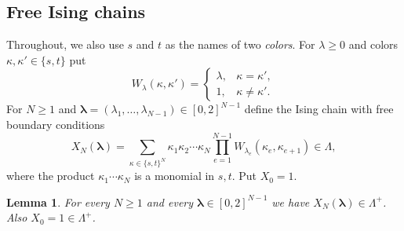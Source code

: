 \documentclass{amsart}
\newtheorem{lemma}[theorem]{Lemma}
\theoremstyle{definition}
\theoremstyle{remark}
\numberwithin{equation}{section}
\newcommand{\Lp}{\Lambda^{+}}
\begin{document}
\subsection{Free Ising chains}
Throughout, we also use $s$ and $t$ as the names of two \emph{colors}. For $\lambda\ge0$ and colors $\kappa,\kappa'\in\{s,t\}$ put
\[
W_\lambda(\kappa,\kappa')=\begin{cases}\lambda,&\kappa=\kappa',\\ 1,&\kappa\ne\kappa'.\end{cases}
\]
For $N\ge1$ and $\boldsymbol\lambda=(\lambda_1,\dots,\lambda_{N-1})\in[0,2]^{N-1}$ define the Ising chain with free boundary conditions
\[
X_N(\boldsymbol\lambda)=\sum_{\kappa\in\{s,t\}^N}\kappa_1\kappa_2\cdots\kappa_N\prod_{e=1}^{N-1}W_{\lambda_e}(\kappa_e,\kappa_{e+1})\in\Lambda,
\]
where the product $\kappa_1\cdots\kappa_N$ is a monomial in $s,t$. Put $X_0=1$.

\begin{lemma}\label{lem:ising}
For every $N\ge1$ and every $\boldsymbol\lambda\in[0,2]^{N-1}$ we have $X_N(\boldsymbol\lambda)\in\Lp$. Also $X_0=1\in\Lp$.
\end{lemma}
\end{document}
